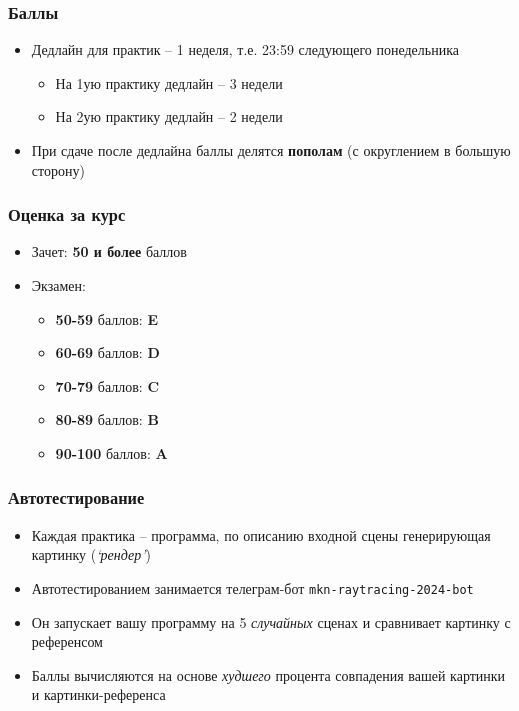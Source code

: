\documentclass[10pt]{beamer}
\begin{document}
\begin{frame}
\frametitle{Баллы}
\begin{itemize}
\item Дедлайн для практик -- 1 неделя, т.е. 23:59 следующего понедельника
\pause
\begin{itemize}
\item На 1ую практику дедлайн -- 3 недели
\item На 2ую практику дедлайн -- 2 недели
\end{itemize}
\pause
\item При сдаче после дедлайна баллы делятся \textbf{пополам} (с округлением в большую сторону)
\end{itemize}
\end{frame}

\begin{frame}
\frametitle{Оценка за курс}
\pause
\begin{itemize}
\item Зачет: \textbf{50 и более} баллов
\pause
\item Экзамен:
\begin{itemize}
\item \textbf{50-59} баллов: \textbf{E}
\item \textbf{60-69} баллов: \textbf{D}
\item \textbf{70-79} баллов: \textbf{C}
\item \textbf{80-89} баллов: \textbf{B}
\item \textbf{90-100} баллов: \textbf{A}
\end{itemize}
\end{itemize}
\end{frame}

\begin{frame}
\frametitle{Автотестирование}
\begin{itemize}
\item Каждая практика -- программа, по описанию входной сцены генерирующая картинку (\textit{`рендер'})
\pause
\item Автотестированием занимается телеграм-бот \texttt{mkn-raytracing-2024-bot}
\pause
\item Он запускает вашу программу на 5 \textit{случайных} сценах и сравнивает картинку с референсом
\pause
\item Баллы вычисляются на основе \textit{худшего} процента совпадения вашей картинки и картинки-референса
\end{itemize}
\end{frame}
\end{document}
